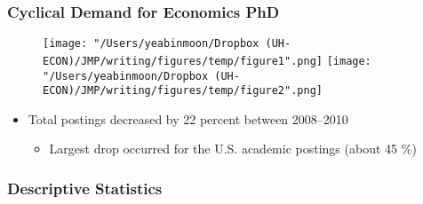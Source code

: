 \documentclass[11pt]{beamer}
\begin{document}
\begin{frame}
	\frametitle{Cyclical Demand for Economics PhD}

\begin{figure}
	\centering
\texttt{[image: "/Users/yeabinmoon/Dropbox (UH-ECON)/JMP/writing/figures/temp/figure1".png]} 
\texttt{[image: "/Users/yeabinmoon/Dropbox (UH-ECON)/JMP/writing/figures/temp/figure2".png]} 
\end{figure}
			
\begin{itemize}	
\item Total postings decreased by 22 percent between 2008--2010
\begin{itemize}
	\item Largest drop occurred for the U.S. academic postings (about 45 \%)
\end{itemize}
\end{itemize}
\end{frame}



\begin{frame}
	\frametitle{Descriptive Statistics}
	
\end{frame}
\end{document}
